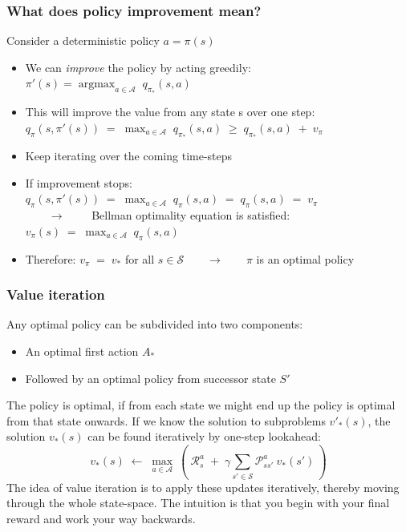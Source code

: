 \documentclass[10pt]{article}
\begin{document}
\subsubsection*{What does policy improvement mean?}
Consider a deterministic policy $a = \pi(s)$
\begin{itemize}
\item We can \textit{improve} the policy by acting greedily:  $\pi'(s) = \mathop{argmax}_{a \in \mathcal{A}} \; q_{\pi_{*}}(s,a)$
\item This will improve the value from any state s over one step: \\
$q_{\pi}(s, \pi'(s)) \;= \; \mathop{max}_{a \in \mathcal{A}} \; q_{\pi_{*}}(s,a) \; \geq \; q_{\pi_{*}}(s,a)\; + \; v_{\pi}$
\item Keep iterating over the coming time-steps
\item If improvement stops: \\
 $q_{\pi}(s, \pi'(s)) \;= \; \mathop{max}_{a \in \mathcal{A}} \; q_{\pi}(s,a) \; = \; q_{\pi}(s,a)\; = \; v_{\pi}$ \\
 $\qquad \rightarrow \qquad$ Bellman optimality equation is satisfied: $v_{\pi}(s)\;=\;\mathop{max}_{a \in \mathcal{A}} \; q_{\pi}(s,a)$
 \item Therefore: $v_{\pi} \; = \; v_{*}$ for all $s \in \mathcal{S} \qquad \rightarrow \qquad \pi$ is an optimal policy
\end{itemize}

\subsubsection*{Value iteration}
Any optimal policy can be subdivided into two components:
\begin{itemize}
\item An optimal first action $A_{*}$
\item Followed by an optimal policy from successor state $S'$
\end{itemize}
The policy is optimal, if from each state we might end up the policy is optimal from that state onwards.
If we know the solution to subproblems $v'_{*}(s)$, the solution $v_{*}(s)$ can be found iteratively by one-step lookahead:
\begin{equation}
v_{*}(s)\; \leftarrow \; \mathop{max}_{a \in \mathcal{A}}\: \left( \: \mathcal{R}_{s}^{a}\;+\;\gamma \sum_{s' \in \mathcal{S}} \mathcal{P}_{ss'}^{a}\:v_{*}(s') \: \right)
\end{equation}
The idea of value iteration is to apply these updates iteratively, thereby moving through the whole state-space. The intuition is that you begin with your final reward and work your way backwards.
\end{document}
